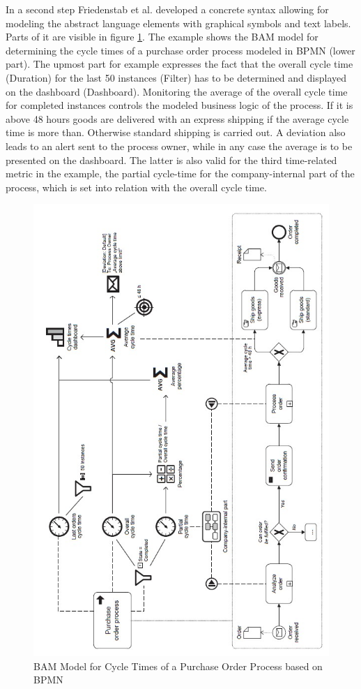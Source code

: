 In a second step Friedenstab et al. developed a concrete syntax allowing for modeling the abstract language elements with graphical symbols and text labels. Parts of it are visible in figure \ref{fig:Model-Cycle-Times}. The example shows the BAM model for determining the cycle times of a purchase order process modeled in BPMN (lower part). The upmost part for example expresses the fact that the overall cycle time (Duration) for the last 50 instances (Filter) has to be determined and displayed on the dashboard (Dashboard). Monitoring the average of the overall cycle time for completed instances controls the modeled business logic of the process. If it is above 48 hours goods are delivered with an express shipping if the average cycle time is more than. Otherwise standard shipping is carried out. A deviation also leads to an alert sent to the process owner, while in any case the average is to be presented on the dashboard. The latter is also valid for the third time-related metric in the example, the partial cycle-time for the company-internal part of the process, which is set into relation with the overall cycle time.

\begin{figure}[htbp]
	\centering
	\includegraphics[width=0.9\linewidth]{Figures/Chapter5/Monitoring/BAM Model for Cycle Times.jpg}
	\caption[BAM Model for Cycle Times of a Purchase Order Process based on BPMN 12]{BAM Model for Cycle Times of a Purchase Order Process based on BPMN \cite{article:BPMNActivityMon}}
	\label{fig:Model-Cycle-Times}
\end{figure}



